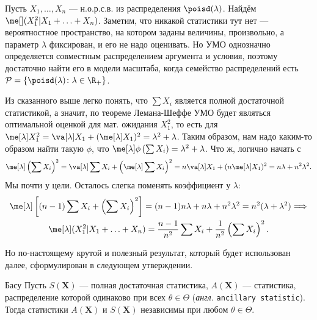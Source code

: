\begin{example}
    Пусть $X_1, \ldots, X_n$ --- н.о.р.с.в. из распределения $\poisd(\lambda)$. Найдём $\me[](X_1^2|X_1 + \ldots + X_n)$. Заметим, что никакой статистики тут нет --- вероятностное пространство, на котором заданы величины, произвольно, а параметр $\lambda$ фиксирован, и его не надо оценивать. Но УМО однозначно определяется совместным распределением аргумента и условия, поэтому достаточно найти его в модели масштаба, когда семейство распределений есть $\mathcal{P} = \{\poisd(\lambda)\colon \lambda \in \R_+\}$.

    Из сказанного выше легко понять, что $\sum X_i$ является полной достаточной статистикой, а значит, по теореме Лемана-Шеффе УМО будет являться оптимальной оценкой для мат. ожидания $X_1^2$, то есть для $\me[\lambda] X_1^2 = \va[\lambda] X_1 + (\me[\lambda] X_1)^2 = \lambda^2 + \lambda$. Таким образом, нам надо каким-то образом найти такую $\phi$, что $\me[\lambda] \phi\left(\sum X_i\right) = \lambda^2 + \lambda$. Что ж, логично начать с
    \begin{gather*}
        \me[\lambda] \left(\sum X_i\right)^2 = \va[\lambda] \sum X_i + \left(\me[\lambda] \sum X_i\right)^2 = n\va[\lambda] X_1 + (n \me[\lambda] X_1)^2 = n\lambda + n^2\lambda^2.
    \end{gather*}
    Мы почти у цели. Осталось слегка поменять коэффициент у $\lambda$:
    \begin{gather*}
    \me[\lambda] \left[(n-1)\sum X_i + \left(\sum X_i\right)^2 \right] = (n - 1) n\lambda + n\lambda + n^2\lambda^2 = n^2(\lambda + \lambda^2) \Longrightarrow\\
    \me[\lambda] (X_1^2|X_1 + \ldots + X_n) = \frac{n - 1}{n^2} \sum X_i + \frac{1}{n^2} \left(\sum X_i\right)^2.
    \end{gather*}
\end{example}

Но по-настоящему крутой и полезный результат, который будет использован далее, сформулирован в следующем утверждении.

\begin{theorem}{Басу}{}
    Пусть $S(\mathbf X)$ --- полная достаточная статистика, $A(\mathbf X)$ --- статистика, распределение которой одинаково при всех $\theta \in \Theta$ (\textit{англ.} \texttt{ancillary statistic}). Тогда статистики $A(\mathbf X)$ и $S(\mathbf X)$ независимы при любом $\theta \in \Theta$.
\end{theorem}

